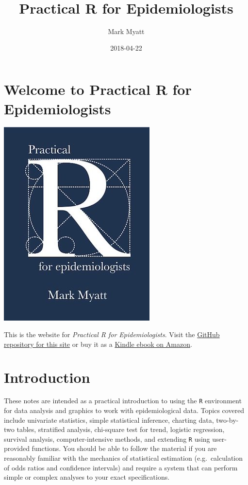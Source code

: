 \documentclass[]{book}
\title{Practical R for Epidemiologists}
\author{Mark Myatt}
\date{2018-04-22}
\theoremstyle{definition}
\theoremstyle{definition}
\theoremstyle{definition}
\theoremstyle{remark}
\begin{document}
\maketitle

{
\hypersetup{linkcolor=black}
\setcounter{tocdepth}{1}
\tableofcontents
}
\hypertarget{welcome-to-practical-r-for-epidemiologists}{%
\chapter*{Welcome to Practical R for
Epidemiologists}\label{welcome-to-practical-r-for-epidemiologists}}

\includegraphics{images/bookcover_medium.jpg}

This is the website for \emph{Practical R for Epidemiologists}. Visit
the
\href{https://github.com/ernestguevarra/practical-r-for-epidemiologists}{GitHub
repository for this site} or buy it as a
\href{https://www.amazon.co.uk/Practical-R-Epidemiologists-Mark-Myatt-ebook/dp/B00DQATKIE/ref=sr_1_1?ie=UTF8\&qid=1524423427\&sr=8-1\&keywords=practical+r+for+epidemiologists}{Kindle
ebook on Amazon}.

\hypertarget{introduction}{%
\chapter*{Introduction}\label{introduction}}

These notes are intended as a practical introduction to using the
\texttt{R} environment for data analysis and graphics to work with
epidemiological data. Topics covered include univariate statistics,
simple statistical inference, charting data, two-by-two tables,
stratified analysis, chi-square test for trend, logistic regression,
survival analysis, computer-intensive methods, and extending \texttt{R}
using user-provided functions. You should be able to follow the material
if you are reasonably familiar with the mechanics of statistical
estimation (e.g.~calculation of odds ratios and confidence intervals)
and require a system that can perform simple or complex analyses to your
exact specifications.
\end{document}
